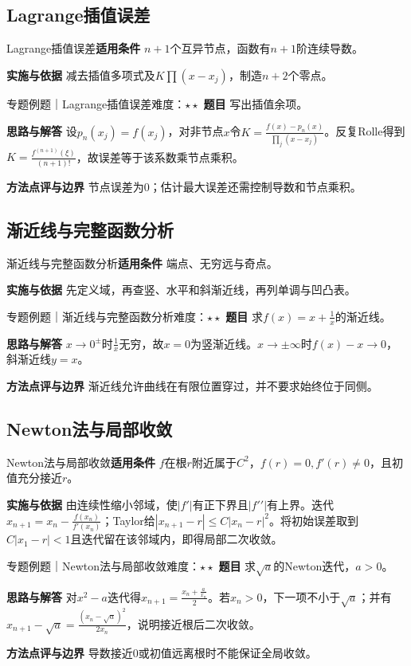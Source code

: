 \subsection{Lagrange插值误差}\label{mat:differentiation:interpolate}
\begin{method}{Lagrange插值误差}\textbf{适用条件} $n+1$个互异节点，函数有$n+1$阶连续导数。\par\textbf{实施与依据} 减去插值多项式及$K\prod(x-x_j)$，制造$n+2$个零点。\end{method}
\begin{example}{专题例题｜Lagrange插值误差}{难度：$\star\star$}
\textbf{题目} 写出插值余项。\par\textbf{思路与解答} 设$p_n(x_j)=f(x_j)$，对非节点$x$令$K=\frac{f(x)-p_n(x)}{\prod_j(x-x_j)}$。反复Rolle得到$K=\frac{f^{(n+1)}(\xi)}{(n+1)!}$，故误差等于该系数乘节点乘积。\par\textbf{方法点评与边界} 节点误差为0；估计最大误差还需控制导数和节点乘积。
\end{example}
\subsection{渐近线与完整函数分析}\label{mat:differentiation:asymptote}
\begin{method}{渐近线与完整函数分析}\textbf{适用条件} 端点、无穷远与奇点。\par\textbf{实施与依据} 先定义域，再查竖、水平和斜渐近线，再列单调与凹凸表。\end{method}
\begin{example}{专题例题｜渐近线与完整函数分析}{难度：$\star\star$}
\textbf{题目} 求$f(x)=x+\frac{1}{x}$的渐近线。\par\textbf{思路与解答} $x\to0^\pm$时$\frac{1}{x}$无穷，故$x=0$为竖渐近线。$x\to\pm\infty$时$f(x)-x\to0$，斜渐近线$y=x$。\par\textbf{方法点评与边界} 渐近线允许曲线在有限位置穿过，并不要求始终位于同侧。
\end{example}
\subsection{Newton法与局部收敛}\label{mat:differentiation:newton}
\begin{method}{Newton法与局部收敛}\textbf{适用条件} $f$在根$r$附近属于$C^2$，$f(r)=0,f\prime(r)\ne0$，且初值充分接近$r$。\par\textbf{实施与依据} 由连续性缩小邻域，使$|f\prime|$有正下界且$|f\prime\prime|$有上界。迭代$x_{n+1}=x_n-\frac{f(x_n)}{f\prime(x_n)}$；Taylor给$|x_{n+1}-r|\le C|x_n-r|^2$。将初始误差取到$C|x_1-r|<1$且迭代留在该邻域内，即得局部二次收敛。\end{method}
\begin{example}{专题例题｜Newton法与局部收敛}{难度：$\star\star$}
\textbf{题目} 求$\sqrt a$的Newton迭代，$a>0$。\par\textbf{思路与解答} 对$x^2-a$迭代得$x_{n+1}=\frac{x_n+\frac{a}{x_n}}{2}$。若$x_n>0$，下一项不小于$\sqrt a$；并有$x_{n+1}-\sqrt a=\frac{(x_n-\sqrt a)^2}{2x_n}$，说明接近根后二次收敛。\par\textbf{方法点评与边界} 导数接近0或初值远离根时不能保证全局收敛。
\end{example}
